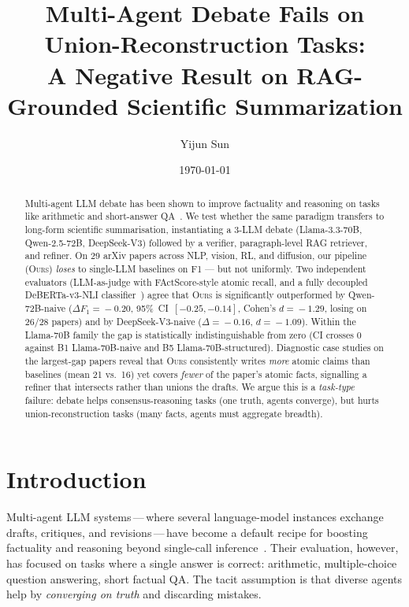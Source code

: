 \documentclass[11pt,a4paper]{article}
\title{Multi-Agent Debate Fails on Union-Reconstruction Tasks:\\
A Negative Result on RAG-Grounded Scientific Summarization}
\author[1]{Yijun Sun}
\affil[1]{University of California, Irvine}
\date{\today}
\begin{document}
\maketitle

\begin{abstract}
Multi-agent LLM debate has been shown to improve factuality and reasoning
on tasks like arithmetic and short-answer
QA~\cite{du2023improving,liang2023encouraging}. We test whether the same
paradigm transfers to long-form scientific summarisation, instantiating a
3-LLM debate (Llama-3.3-70B, Qwen-2.5-72B, DeepSeek-V3) followed by a
verifier, paragraph-level RAG retriever, and refiner. On 29 arXiv papers
across NLP, vision, RL, and diffusion, our pipeline (\textsc{Ours})
\emph{loses} to single-LLM baselines on F1 — but not uniformly. Two
independent evaluators (LLM-as-judge with FActScore-style atomic recall,
and a fully decoupled DeBERTa-v3-NLI classifier~\cite{he2021debertav3})
agree that \textsc{Ours} is significantly outperformed by Qwen-72B-naive
($\Delta F_1\!=\!-0.20$, 95\%~CI~$[-0.25,-0.14]$, Cohen's $d\!=\!-1.29$,
losing on 26/28 papers) and by DeepSeek-V3-naive ($\Delta\!=\!-0.16$,
$d\!=\!-1.09$). Within the Llama-70B family the gap is statistically
indistinguishable from zero (CI crosses 0 against B1 Llama-70B-naive and
B5 Llama-70B-structured). Diagnostic case studies on the largest-gap
papers reveal that \textsc{Ours} consistently writes \emph{more} atomic
claims than baselines (mean 21 vs.\ 16) yet covers \emph{fewer} of the
paper's atomic facts, signalling a refiner that intersects rather than
unions the drafts. We argue this is a \emph{task-type} failure: debate
helps consensus-reasoning tasks (one truth, agents converge), but hurts
union-reconstruction tasks (many facts, agents must aggregate breadth).
\end{abstract}

\section{Introduction}
\label{sec:intro}

Multi-agent LLM systems\,---\,where several language-model instances
exchange drafts, critiques, and revisions\,---\,have become a
default recipe for boosting factuality and reasoning beyond
single-call inference~\cite{du2023improving,wu2023autogen,liang2023encouraging,madaan2023selfrefine}.
Their evaluation, however, has focused on tasks where a single answer
is correct: arithmetic, multiple-choice question answering, short
factual QA. The tacit assumption is that diverse agents help by
\emph{converging on truth} and discarding mistakes.
\end{document}
